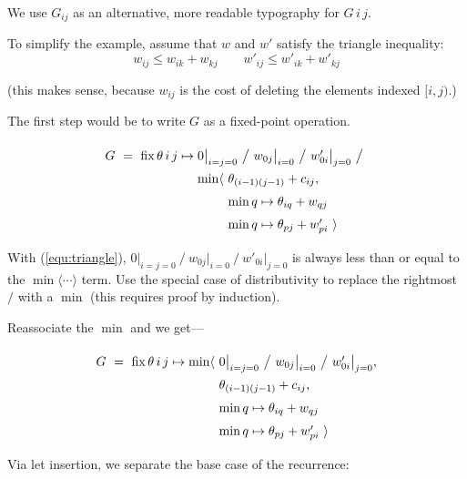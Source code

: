 \documentclass{article}
\begin{document}
We use $G_{ij}$ as an alternative, more readable typography for $G\,i\,j$.

To simplify the example, assume that $w$ and $w'$ satisfy the triangle inequality:
%
\begin{equation}
w_{ij} \leq w_{ik} + w_{kj} \qquad w'_{ij} \leq w'_{ik} + w'_{kj}
\label{equ:triangle}
\end{equation}

(this makes sense, because $w_{ij}$ is the cost of deleting the elements indexed $[i,j)$.)

\bigskip
The first step would be to write $G$ as a fixed-point operation.

\[
\renewcommand\arraystretch{1.5}
\begin{array}{l@{}l}
G ~=~ \mathrm{fix}\, \theta\,i\,j \mapsto{} &
  0\big|_{i=j=0} ~\big/~ w_{0j}\big|_{i=0} ~\big/~ w'_{0i}\big|_{j=0}
  ~\big/~ \\
  &
  \begin{array}{@{}l@{~}l}
    \min\langle & \theta_{(i-1)(j-1)} + c_{ij}, \\
                & \min q\mapsto \theta_{iq} + w_{qj} \\
                & \min q\mapsto \theta_{pj} + w'_{pi}~\rangle
  \end{array}
\end{array}
\]

With (\ref{equ:triangle}), $0\big|_{i=j=0} ~\big/~ w_{0j}\big|_{i=0} ~\big/~ w'_{0i}\big|_{j=0}$
is always less than or equal to the $\min\langle\cdots\rangle$ term. Use the special case of distributivity
to replace the rightmost $/$ with a $\min$ (this requires proof by induction).

Reassociate the $\min$ and we get---

\[
\renewcommand\arraystretch{1.5}
\begin{array}{l@{~}l}
G ~=~ \mathrm{fix}\, \theta\,i\,j \mapsto \min\langle 
                & 0\big|_{i=j=0} ~\big/~ w_{0j}\big|_{i=0} ~\big/~ w'_{0i}\big|_{j=0}, \\
                & \theta_{(i-1)(j-1)} + c_{ij}, \\
                & \min q\mapsto \theta_{iq} + w_{qj} \\
                & \min q\mapsto \theta_{pj} + w'_{pi}~\rangle
\end{array}
\]

Via let insertion, we separate the base case of the recurrence:

\newcommand\lspan[2]{\multicolumn{#1}{@{}l}{#2}}
\end{document}
